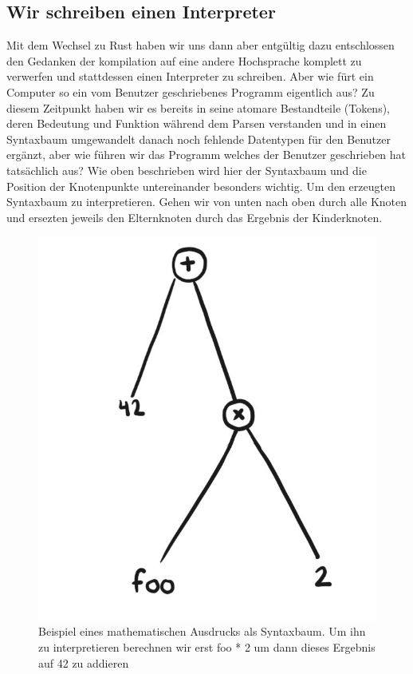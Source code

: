 \documentclass[a4paper, 12pt]{article}
\begin{document}
\subsection{Wir schreiben einen Interpreter}
Mit dem Wechsel zu Rust haben wir uns dann aber entg\"ultig dazu entschlossen den Gedanken der
kompilation auf eine andere Hochsprache komplett zu verwerfen und stattdessen einen Interpreter zu schreiben.
Aber wie f\"urt ein Computer so ein vom Benutzer geschriebenes Programm
eigentlich aus? Zu diesem Zeitpunkt haben wir es bereits in seine atomare
Bestandteile (Tokens), deren Bedeutung und Funktion w\"ahrend dem
Parsen verstanden und in einen Syntaxbaum umgewandelt danach noch fehlende
Datentypen f\"ur den Benutzer erg\"anzt, aber wie f\"uhren wir das Programm
welches der Benutzer geschrieben hat tats\"achlich aus?
Wie oben beschrieben wird hier der Syntaxbaum und die Position der Knotenpunkte untereinander besonders wichtig.
Um den erzeugten Syntaxbaum zu interpretieren. Gehen wir von unten nach oben durch alle Knoten und ersezten jeweils den Elternknoten durch das Ergebnis der Kinderknoten.
\begin{figure}[h]
\caption{Beispiel eines mathematischen Ausdrucks als Syntaxbaum. Um ihn zu interpretieren berechnen wir erst foo * 2 um dann dieses Ergebnis auf 42 zu addieren}
\includegraphics[scale=0.2]{astright}
\end{figure}
\end{document}
